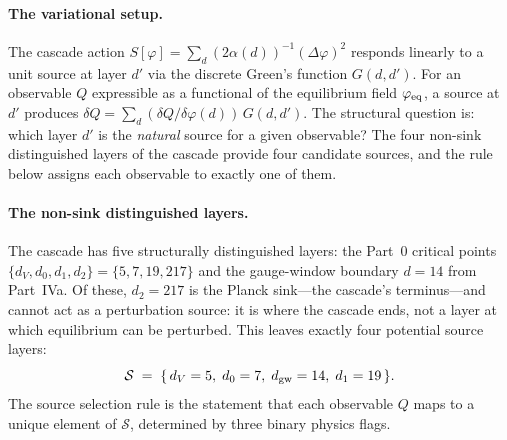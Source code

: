 \documentclass[12pt,a4paper]{article}
\begin{document}
\paragraph{The variational setup.}
The cascade action $S[\varphi]=\sum_d(2\alpha(d))^{-1}(\Delta\varphi)^2$ responds linearly to a unit source at layer $d'$ via the discrete Green's function $G(d,d')$. For an observable $Q$ expressible as a functional of the equilibrium field $\varphi_{\rm eq}$, a source at $d'$ produces $\delta Q=\sum_d(\delta Q/\delta\varphi(d))\,G(d,d')$. The structural question is: which layer $d'$ is the \emph{natural} source for a given observable? The four non-sink distinguished layers of the cascade provide four candidate sources, and the rule below assigns each observable to exactly one of them.

\paragraph{The non-sink distinguished layers.}
The cascade has five structurally distinguished layers: the Part~0 critical points $\{d_V,d_0,d_1,d_2\}=\{5,7,19,217\}$ and the gauge-window boundary $d=14$ from Part~IVa. Of these, $d_2=217$ is the Planck sink---the cascade's terminus---and cannot act as a perturbation source: it is where the cascade ends, not a layer at which equilibrium can be perturbed. This leaves exactly four potential source layers:
\[
\mathcal{S} \;=\; \{\,d_V=5,\;d_0=7,\;d_{\rm gw}=14,\;d_1=19\,\}.
\]
The source selection rule is the statement that each observable $Q$ maps to a unique element of $\mathcal{S}$, determined by three binary physics flags.
\end{document}
